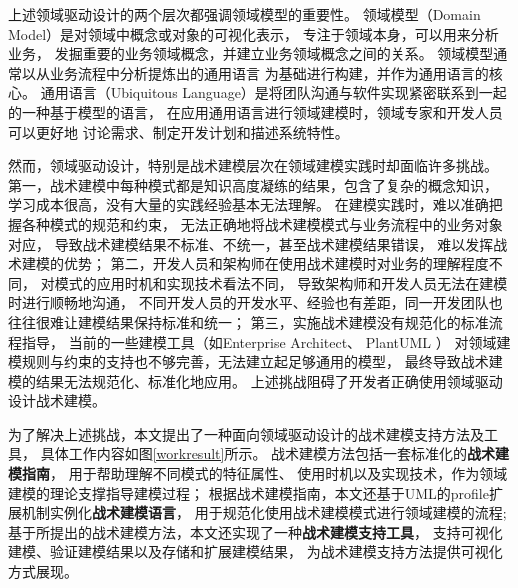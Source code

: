 上述领域驱动设计的两个层次都强调领域模型的重要性。
领域模型（Domain Model）是对领域中概念或对象的可视化表示，
专注于领域本身，可以用来分析业务，
发掘重要的业务领域概念，并建立业务领域概念之间的关系。
领域模型通常以从业务流程中分析提炼出的通用语言
为基础进行构建，并作为通用语言的核心。
通用语言（Ubiquitous Language）是将团队沟通与软件实现紧密联系到一起的一种基于模型的语言，
在应用通用语言进行领域建模时，领域专家和开发人员可以更好地
讨论需求、制定开发计划和描述系统特性。




然而，领域驱动设计，特别是战术建模层次在领域建模实践时却面临许多挑战。
第一，战术建模中每种模式都是知识高度凝练的结果，包含了复杂的概念知识，
学习成本很高，没有大量的实践经验基本无法理解。
在建模实践时，难以准确把握各种模式的规范和约束，
无法正确地将战术建模模式与业务流程中的业务对象对应，
导致战术建模结果不标准、不统一，甚至战术建模结果错误，
难以发挥战术建模的优势；
第二，开发人员和架构师在使用战术建模时对业务的理解程度不同，
对模式的应用时机和实现技术看法不同，
导致架构师和开发人员无法在建模时进行顺畅地沟通，
不同开发人员的开发水平、经验也有差距，同一开发团队也往往很难让建模结果保持标准和统一；
第三，实施战术建模没有规范化的标准流程指导，
当前的一些建模工具（如Enterprise Architect\footnotemark[1]、
PlantUML \footnotemark[2]）
对领域建模规则与约束的支持也不够完善，无法建立起足够通用的模型，
最终导致战术建模的结果无法规范化、标准化地应用。
上述挑战阻碍了开发者正确使用领域驱动设计战术建模。


为了解决上述挑战，本文提出了一种面向领域驱动设计的战术建模支持方法及工具，
具体工作内容如图\ref{workresult}所示。
战术建模方法包括一套标准化的\textbf{战术建模指南}，
用于帮助理解不同模式的特征属性、
使用时机以及实现技术，作为领域建模的理论支撑指导建模过程；
根据战术建模指南，本文还基于UML的profile扩展机制实例化\textbf{战术建模语言}，
用于规范化使用战术建模模式进行领域建模的流程;
基于所提出的战术建模方法，本文还实现了一种\textbf{战术建模支持工具}，
支持可视化建模、验证建模结果以及存储和扩展建模结果，
为战术建模支持方法提供可视化方式展现。


